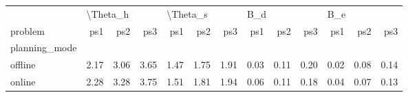 \begin{tabular}{lrrrrrrrrrrrr}
\toprule
{} & \multicolumn{3}{l}{\textbackslash Theta\_h} & \multicolumn{3}{l}{\textbackslash Theta\_s} & \multicolumn{3}{l}{B\_d} & \multicolumn{3}{l}{B\_e} \\
problem &      ps1 &  ps2 &  ps3 &      ps1 &  ps2 &  ps3 &  ps1 &  ps2 &  ps3 &  ps1 &  ps2 &  ps3 \\
planning\_mode &          &      &      &          &      &      &      &      &      &      &      &      \\
\midrule
offline       &     2.17 & 3.06 & 3.65 &     1.47 & 1.75 & 1.91 & 0.03 & 0.11 & 0.20 & 0.02 & 0.08 & 0.14 \\
online        &     2.28 & 3.28 & 3.75 &     1.51 & 1.81 & 1.94 & 0.06 & 0.11 & 0.18 & 0.04 & 0.07 & 0.13 \\
\bottomrule
\end{tabular}
